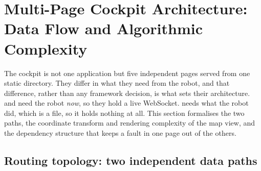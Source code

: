 \section{Multi-Page Cockpit Architecture: Data Flow and Algorithmic
Complexity}
\label{sec:multipage}

The cockpit is not one application but five independent pages served from one
static directory. They differ in what they need from the robot, and that
difference, rather than any framework decision, is what sets their
architecture.  and  need the robot
\emph{now}, so they hold a live WebSocket.  needs what the
robot did, which is a file, so it holds nothing at all. This section
formalises the two paths, the coordinate transform and rendering complexity of
the map view, and the dependency structure that keeps a fault in one page out
of the others.

\subsection{Routing topology: two independent data paths}

